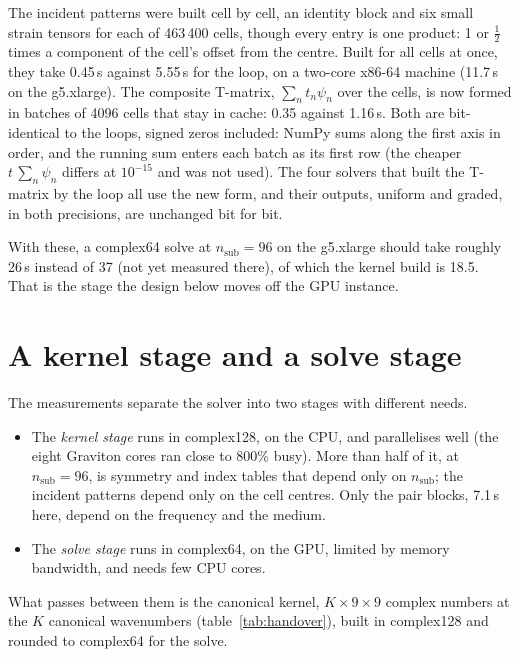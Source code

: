 \documentclass[11pt,a4paper]{article}
\newcommand{\nsub}{n_{\mathrm{sub}}}
\begin{document}
The incident patterns were built cell by cell, an identity block and six small strain tensors for each of 463\,400
cells, though every entry is one product: 1 or $\tfrac12$ times a component of the cell's offset from the centre.
Built for all cells at once, they take 0.45\,s against 5.55\,s for the loop, on a two-core x86-64 machine (11.7\,s on
the g5.xlarge). The composite T-matrix, $\sum_n t_n \psi_n$ over the cells, is now formed in batches of 4096 cells
that stay in cache: 0.35 against 1.16\,s. Both are bit-identical to the loops, signed zeros included: NumPy sums
along the first axis in order, and the running sum enters each batch as its first row (the cheaper
$t\,\sum_n\psi_n$ differs at $10^{-15}$ and was not used). The four solvers that built the T-matrix by the loop all
use the new form, and their outputs, uniform and graded, in both precisions, are unchanged bit for bit.

With these, a complex64 solve at $\nsub = 96$ on the g5.xlarge should take roughly 26\,s instead of 37 (not yet
measured there), of which the kernel build is 18.5. That is the stage the design below moves off the GPU instance.

\section{A kernel stage and a solve stage}\label{sec:design}

The measurements separate the solver into two stages with different needs.

\begin{itemize}
\item The \emph{kernel stage} runs in complex128, on the CPU, and parallelises well (the eight Graviton cores ran
close to 800\% busy). More than half of it, at $\nsub = 96$, is symmetry and index tables that depend only on $\nsub$; the incident
patterns depend only on the cell centres. Only the pair blocks, 7.1\,s here, depend on the frequency and the medium.
\item The \emph{solve stage} runs in complex64, on the GPU, limited by memory bandwidth, and needs few CPU cores.
\end{itemize}

What passes between them is the canonical kernel, $K \times 9 \times 9$ complex numbers at the $K$ canonical
wavenumbers (table~\ref{tab:handover}), built in complex128 and rounded to complex64 for the solve.
\end{document}
